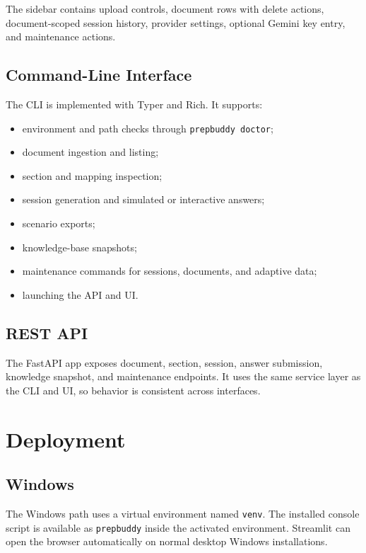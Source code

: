\documentclass[11pt]{article}
\begin{document}
The sidebar contains upload controls, document rows with delete actions, document-scoped session history, provider settings, optional Gemini key entry, and maintenance actions.

\subsection{Command-Line Interface}

The CLI is implemented with Typer and Rich. It supports:

\begin{itemize}
  \item environment and path checks through \texttt{prepbuddy doctor};
  \item document ingestion and listing;
  \item section and mapping inspection;
  \item session generation and simulated or interactive answers;
  \item scenario exports;
  \item knowledge-base snapshots;
  \item maintenance commands for sessions, documents, and adaptive data;
  \item launching the API and UI.
\end{itemize}

\subsection{REST API}

The FastAPI app exposes document, section, session, answer submission, knowledge snapshot, and maintenance endpoints. It uses the same service layer as the CLI and UI, so behavior is consistent across interfaces.

\section{Deployment}

\subsection{Windows}

The Windows path uses a virtual environment named \texttt{venv}. The installed console script is available as \texttt{prepbuddy} inside the activated environment. Streamlit can open the browser automatically on normal desktop Windows installations.
\end{document}
